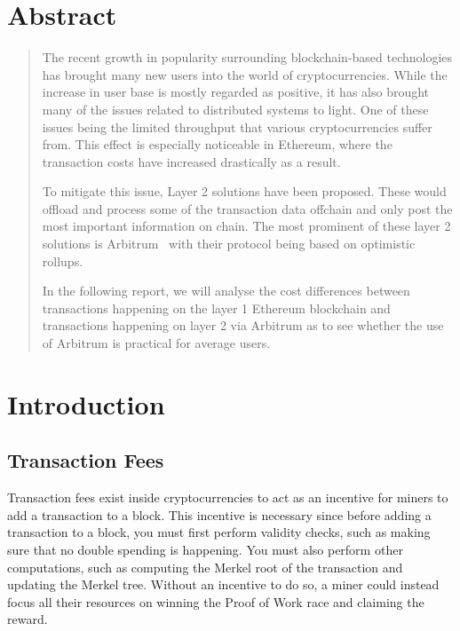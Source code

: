 \documentclass[a4paper,oneside,openright,11pt]{report}
\begin{document}
\chapter*{\centering Abstract}
\begin{quote}\noindent
  The recent growth in popularity surrounding blockchain-based technologies has brought many
  new users into the world of cryptocurrencies. While the increase in user base is mostly regarded 
  as positive, it has also brought many of the issues related to distributed systems to light. One of 
  these issues being the limited throughput that various cryptocurrencies suffer from.
  This effect is especially noticeable in Ethereum, where the transaction costs have
  increased drastically as a result.
  
  To mitigate this issue, Layer 2 solutions have been proposed. These would offload and process
  some of the transaction data offchain and only post the most important information on chain.
  The most prominent of these layer 2 solutions is Arbitrum~\cite{l2Beat} with their protocol 
  being based on optimistic rollups.
  
  In the following report, we will analyse the cost differences between transactions happening on 
  the layer 1 Ethereum blockchain and transactions happening on layer 2 via Arbitrum as to see 
  whether the use of Arbitrum is practical for average users.
\end{quote}

\tableofcontents


\chapter{Introduction}
\label{ch:intro}

\section{Transaction Fees}
Transaction fees exist inside cryptocurrencies to act as an incentive for miners to add a 
transaction to a block. This incentive is necessary since before adding a transaction to a block, 
you must first perform validity checks, such as making sure that no double spending is happening. 
You must also perform other computations, such as computing the Merkel root of the transaction 
and updating the Merkel tree. Without an incentive to do so, a miner could instead focus all their 
resources on winning the Proof of Work race and claiming the reward.
\end{document}
